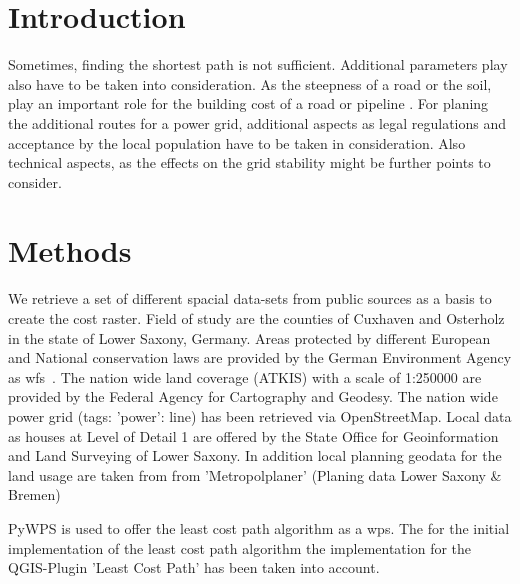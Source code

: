 \documentclass[acmtog]{acmart}
\begin{document}
	\section{Introduction}
	
	Sometimes, finding the shortest path is not sufficient. Additional parameters play also have to be taken into consideration. As the steepness of a road or the soil,
	play an important role for the building cost of a road or pipeline . For planing the additional routes for a power grid, additional aspects as legal regulations and acceptance by the local population have to be taken in consideration. Also technical aspects, as the effects on the grid stability might be further points to consider.\cite{schafer_understanding_2022}


	\section{Methods}
	We retrieve a set of different spacial data-sets from  public sources as a basis to create the cost raster. Field of study are the counties of Cuxhaven and Osterholz in the state of Lower Saxony, Germany.
	Areas protected by different European and National conservation laws are provided by the German Environment Agency as \acrfull{wfs}~\cite{noauthor_schutzgebiete_2015}. The nation wide land coverage (ATKIS) with a scale of 1:250000 are provided by the Federal Agency for Cartography and Geodesy\cite{noauthor_digitales_2021}. The nation wide power grid (tags: 'power': line) has been retrieved via OpenStreetMap.\cite{boeing_osmnx_2017}
	Local data as houses at Level of Detail 1 are offered by the State Office for Geoinformation and Land Surveying of Lower Saxony\cite{noauthor_opengeodatani_2022}. In addition local planning geodata for the land usage are taken from 
	from 'Metropolplaner' (Planing data Lower Saxony \& Bremen)\cite{noauthor_metropolplaner_2022}
	
	PyWPS\cite{noauthor_welcome_2016} is used to offer the least cost path algorithm as a \acrfull{wps}.
	The for the initial implementation of the least cost path algorithm the implementation for the QGIS-Plugin 'Least Cost Path'\cite{noauthor_leastcostpathdijkstra_algorithmpy_2022} has been taken into account.
	
\end{document}
